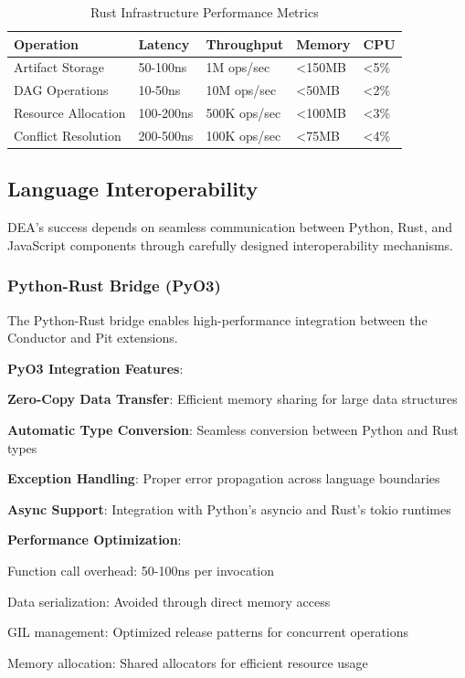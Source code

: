 \begin{table}[h]
\centering
\caption{Rust Infrastructure Performance Metrics}
\label{tab:rust-performance}
\begin{tabular}{@{}lllll@{}}
\toprule
\textbf{Operation} & \textbf{Latency} & \textbf{Throughput} & \textbf{Memory} & \textbf{CPU} \\
\midrule
Artifact Storage & 50-100ns & 1M ops/sec & <150MB & <5\% \\
DAG Operations & 10-50ns & 10M ops/sec & <50MB & <2\% \\
Resource Allocation & 100-200ns & 500K ops/sec & <100MB & <3\% \\
Conflict Resolution & 200-500ns & 100K ops/sec & <75MB & <4\% \\
\bottomrule
\end{tabular}
\end{table}

\subsection*{Language Interoperability}

DEA's success depends on seamless communication between Python, Rust, and JavaScript components through carefully designed interoperability mechanisms.

\subsubsection*{Python-Rust Bridge (PyO3)}

The Python-Rust bridge enables high-performance integration between the Conductor and Pit extensions.

\textbf{PyO3 Integration Features}:
\begin{compactlist}
    \item \textbf{Zero-Copy Data Transfer}: Efficient memory sharing for large data structures
    \item \textbf{Automatic Type Conversion}: Seamless conversion between Python and Rust types
    \item \textbf{Exception Handling}: Proper error propagation across language boundaries
    \item \textbf{Async Support}: Integration with Python's asyncio and Rust's tokio runtimes
\end{compactlist}

\textbf{Performance Optimization}:
\begin{compactlist}
    \item Function call overhead: 50-100ns per invocation
    \item Data serialization: Avoided through direct memory access
    \item GIL management: Optimized release patterns for concurrent operations
    \item Memory allocation: Shared allocators for efficient resource usage
\end{compactlist}

